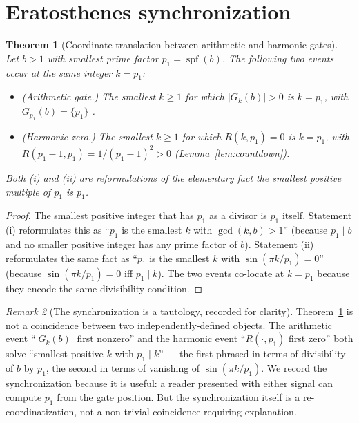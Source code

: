 \documentclass[11pt,reqno]{amsart}
\theoremstyle{plain}
\newtheorem{theorem}{Theorem}[section]
\theoremstyle{definition}
\theoremstyle{remark}
\newtheorem{remark}[theorem]{Remark}
\DeclareMathOperator{\spf}{spf}
\begin{document}
\section{Eratosthenes synchronization}
\label{sec:synchronization}

\begin{theorem}[Coordinate translation between arithmetic and
harmonic gates]
\label{thm:zerowidth}
Let $b > 1$ with smallest prime factor $p_1 = \spf(b)$. The
following two events occur at the same integer $k = p_1$:
\begin{itemize}\setlength\itemsep{2pt}
\item[\rm (i)] (Arithmetic gate.) The smallest $k \ge 1$ for which
$|G_k(b)| > 0$ is $k = p_1$, with $G_{p_1}(b) = \{p_1\}$
\cite[Theorem~3.1]{J04Sanders}.
\item[\rm (ii)] (Harmonic zero.) The smallest $k \ge 1$ for
which $R(k, p_1) = 0$ is $k = p_1$, with $R(p_1 - 1, p_1) =
1/(p_1 - 1)^2 > 0$ (Lemma~\ref{lem:countdown}).
\end{itemize}
Both (i) and (ii) are reformulations of the elementary fact
\emph{the smallest positive multiple of $p_1$ is $p_1$}.
\end{theorem}

\begin{proof}
The smallest positive integer that has $p_1$ as a divisor is
$p_1$ itself. Statement (i) reformulates this as ``$p_1$ is the
smallest $k$ with $\gcd(k, b) > 1$'' (because $p_1 \mid b$ and
no smaller positive integer has any prime factor of $b$).
Statement (ii) reformulates the same fact as ``$p_1$ is the
smallest $k$ with $\sin(\pi k / p_1) = 0$'' (because
$\sin(\pi k / p_1) = 0$ iff $p_1 \mid k$). The two events
co-locate at $k = p_1$ because they encode the same divisibility
condition.
\end{proof}

\begin{remark}[The synchronization is a tautology, recorded for
clarity]\label{rem:tautology}
Theorem~\ref{thm:zerowidth} is not a coincidence between two
independently-defined objects. The arithmetic event ``$|G_k(b)|$
first nonzero'' and the harmonic event
``$R(\cdot, p_1)$ first zero'' both solve ``smallest positive
$k$ with $p_1 \mid k$'' --- the first phrased in terms of
divisibility of $b$ by $p_1$, the second in terms of vanishing
of $\sin(\pi k / p_1)$. We record the synchronization because
it is useful: a reader presented with either signal can compute
$p_1$ from the gate position. But the synchronization itself is
a re-coordinatization, not a non-trivial coincidence requiring
explanation.
\end{remark}
\end{document}
